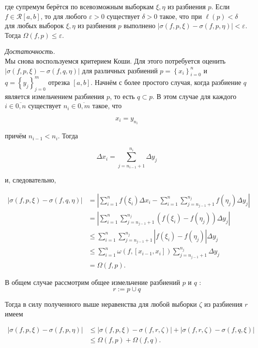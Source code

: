\documentclass[a4paper,12pt]{article} %
\begin{document}
	где супремум берётся по всевозможным выборкам $\xi, \eta$ из разбиения $p$. Если $f \in \mathcal{R}[a, b]$, то для любого $\varepsilon>0$ существует $\delta>0$ такое, что при $\ell(p)<\delta$ для любых выборок $\xi, \eta$ из разбиения $p$ выполнено $|\sigma(f, p, \xi)-\sigma(f, p, \eta)|<\varepsilon$. Тогда $\Omega(f, p) \leq \varepsilon$.
	
	\textit{Достаточность.}\\ Мы снова воспользуемся критерием Коши. Для этого потребуется оценить $|\sigma(f, p, \xi)-\sigma(f, q, \eta)|$ для различных разбиений $p=\left\{x_{i}\right\}_{i=0}^{n}$ и $q=\left\{y_{j}\right\}_{j=0}^{m}$ отрезка $[a, b]$. Начнём с более простого случая, когда разбиение $q$ является измельчением разбиения $p$, то есть $q \subset p$. В этом случае для каждого $i \in \overline{0, n}$ существует $n_{i} \in \overline{0, m}$ такое, что
	
	$$
	x_{i}=y_{n_{i}}
	$$
	
	причём $n_{i-1}<n_{i}$. Тогда
	
	$$
	\Delta x_{i}=\sum_{j=n_{i-1}+1}^{n_{i}} \Delta y_{j}
	$$
	
	и, следовательно,
	
	$$
	\begin{aligned}
	|\sigma(f, p, \xi)-\sigma(f, q, \eta)| & =\left|\sum_{i=1}^{n} f\left(\xi_{i}\right) \Delta x_{i}-\sum_{i=1}^{n} \sum_{j=n_{j-1}+1}^{n_{j}} f\left(\eta_{j}\right) \Delta y_{j}\right| \\
	& =\left|\sum_{i=1}^{n} \sum_{j=n_{j-1}+1}^{n_{j}}\left(f\left(\xi_{i}\right)-f\left(\eta_{j}\right)\right) \Delta y_{j}\right| \\
	& \leq \sum_{i=1}^{n} \sum_{j=n_{j-1}+1}^{n_{j}}\left|f\left(\xi_{i}\right)-f\left(\eta_{j}\right)\right| \Delta y_{j} \\
	& \leq \sum_{i=1}^{n} \omega\left(f,\left[x_{i-1}, x_{i}\right]\right) \sum_{j=n_{j-1}+1}^{n_{j}} \Delta y_{j} \\
	& =\Omega(f, p) .
	\end{aligned}
	$$
	
	В общем случае рассмотрим общее измельчение разбиений $p$ и $q$ :
	$$
	r:=p \cup q
	$$
	
	Тогда в силу полученного выше неравенства для любой выборки $\zeta$ из разбиения $r$ имеем
	
	$$
	\begin{aligned}
	|\sigma(f, p, \xi)-\sigma(f, p, \eta)| & \leq|\sigma(f, p, \xi)-\sigma(f, r, \zeta)|+|\sigma(f, r, \zeta)-\sigma(f, q, \xi)| \\
	& \leq \Omega(f, p)+\Omega(f, q) .
	\end{aligned}
	$$
	
\end{document}
